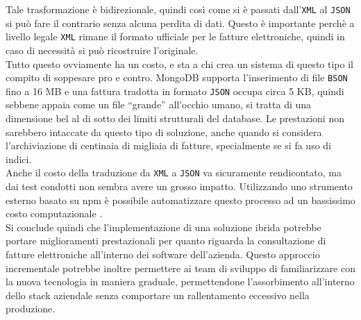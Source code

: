 \noindent Tale trasformazione è bidirezionale, quindi così come si è passati dall'\texttt{XML} al \texttt{JSON} si può fare il contrario senza alcuna perdita di dati. Questo è importante perchè a livello legale \texttt{XML} rimane il formato ufficiale per le fatture elettroniche, quindi in caso di necessità si può ricostruire l'originale.\\

\noindent Tutto questo ovviamente ha un costo, e sta a chi crea un sistema di questo tipo il compito di soppesare pro e contro. MongoDB supporta l'inserimento di file \texttt{BSON} fino a 16 MB e una fattura tradotta in formato \texttt{JSON} occupa circa 5 KB, quindi sebbene appaia come un file ``grande'' all'occhio umano, si tratta di una dimensione bel al di sotto dei limiti strutturali del database. Le prestazioni non sarebbero intaccate da questo tipo di soluzione, anche quando si considera l'archiviazione di centinaia di migliaia di fatture, specialmente se si fa uso di indici.\\
Anche il costo della traduzione da \texttt{XML} a \texttt{JSON} va sicuramente rendicontato, ma dai test condotti non sembra avere un grosso impatto. Utilizzando uno strumento esterno basato su \gls{npm} è possibile automatizzare questo processo ad un bassissimo costo computazionale \cite{site:xml-js}.\\

\noindent Si conclude quindi che l'implementazione di una soluzione ibrida potrebbe portare miglioramenti prestazionali per quanto riguarda la consultazione di fatture elettroniche all'interno dei software dell'azienda. Questo approccio incrementale potrebbe inoltre permettere ai team di sviluppo di familiarizzare con la nuova tecnologia in maniera graduale, permettendone l'assorbimento all'interno dello stack aziendale senza comportare un rallentamento eccessivo nella produzione.
